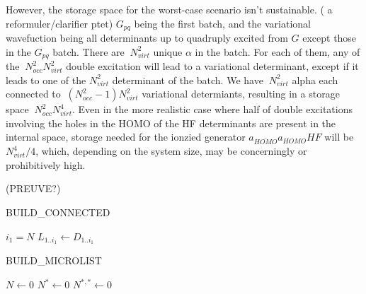 \documentclass[./thesis.tex]{subfiles}
\begin{document}
However, the storage space for the worst-case scenario isn't sustainable. ( a reformuler/clarifier ptet)
$G_{pq}$ being the first batch, and the variational wavefuction being all determinants up to quadruply excited from $G$ except those in the $G_{pq}$ batch. There are $~ N_{virt}^2$ unique $\alpha$ in the batch. For each of them, any of the $~N_{occ}^2 N_{virt}^2$ double excitation will lead to a variational determinant, except if it leads to one of the $N_{virt}^2$ determinant of the batch.
We have $~ N_{virt}^2$ alpha each connected to $~(N_{occ}^2-1) N_{virt}^2$ variational determiants, resulting in a storage space $~N_{occ}^2 N_{virt}^4$.
Even in the more realistic case where half of double excitations involving the holes in the HOMO of the HF determinants are present in the internal space, storage needed for the ionzied generator $a_{\bar{HOMO}} a_{HOMO} HF$ will be $N_{virt}^4 / 4$, which, depending on the system size, may be concerningly or prohibitively high. 

(PREUVE?)

\begin{algorithm}
	\label{BUILD_CONNECTED}
	\caption{BUILD\_CONNECTED}
		\KwData{ ---------}
		\KwResult{ ------------}
        $i_1 = N$ \;   
        $L_{1..i_1} \gets D_{1..{i_1}}$ \;
\end{algorithm}



\begin{algorithm}
	\label{BUILD_MICROLIST}
	\caption{BUILD\_MICROLIST}
		\KwData{ ------}
		\KwResult{ ------}
        $N \gets 0$ \;
        $N^* \gets 0$ \;   
        $N^{*,*} \gets 0$ \;    
\end{algorithm}
\end{document}
